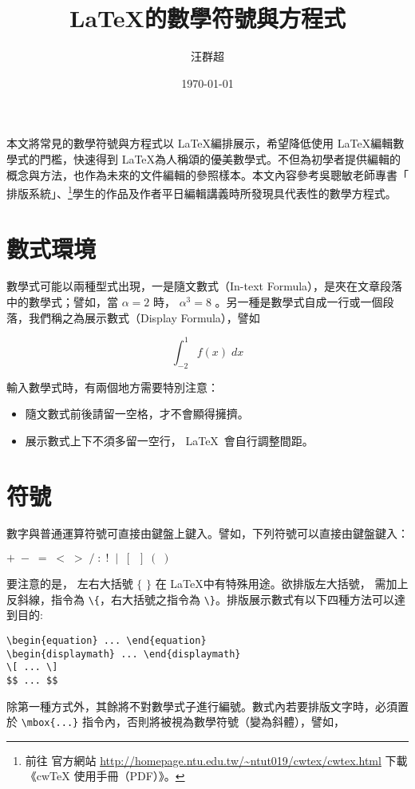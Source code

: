 \title{ \LaTeX 的數學符號與方程式}
\author{{\SM 汪群超}}
\date{{\TT \today}} 	 

\maketitle
\fontsize{12}{22 pt}\selectfont

本文將常見的數學符號與方程式以 \LaTeX 編排展示，希望降低使用  \LaTeX 編輯數學式的門檻，快速得到  \LaTeX 為人稱頌的優美數學式。不但為初學者提供編輯的概念與方法，也作為未來的文件編輯的參照樣本。本文內容參考吳聰敏老師專書「\cw{} 排版系統」、\footnote{前往 \cw{} 官方網站 \url{http://homepage.ntu.edu.tw/~ntut019/cwtex/cwtex.html} 下載《cwTeX 使用手冊（PDF）》。}學生的作品及作者平日編輯講義時所發現具代表性的數學方程式。

\section{數式環境}
數學式可能以兩種型式出現，一是隨文數式（In-text Formula），是夾在文章段落中的數學式；譬如，當 $\alpha=2$ 時， $\alpha^3=8$ 。另一種是數學式自成一行或一個段落，我們稱之為展示數式（Display Formula），譬如

$$\int_{-2}^{1} f(x)\;dx$$

輸入數學式時，有兩個地方需要特別注意：

\begin{itemize}
\item 隨文數式前後請留一空格，才不會顯得擁擠。
\item 展示數式上下不須多留一空行， \LaTeX\ 會自行調整間距。
\end{itemize}

\section{符號}
數字與普通運算符號可直接由鍵盤上鍵入。譬如，下列符號可以直接由鍵盤鍵入：

        \begin{center}
         $  + \;-\; =\; <\; > \;/ \;:\; !\;\; |\; \;[\;\; ] \;(\; )$\\
        \end{center}
要注意的是， 左右大括號  $\{$ $\}$ 在 \LaTeX 中有特殊用途。欲排版左大括號， 需加上反斜線，指令為 \verb+\{+，右大括號之指令為 \verb+\}+。排版展示數式有以下四種方法可以達到目的:
        \begin{center}
        \verb+\begin{equation} ... \end{equation}+\\
		\verb+\begin{displaymath} ... \end{displaymath}+\\
		\verb+\[ ... \]+\\
		\verb+$$ ... $$+
        \end{center}
除第一種方式外，其餘將不對數學式子進行編號。數式內若要排版文字時，必須置於 \verb+\mbox{...}+ 指令內，否則將被視為數學符號（變為斜體），譬如，

